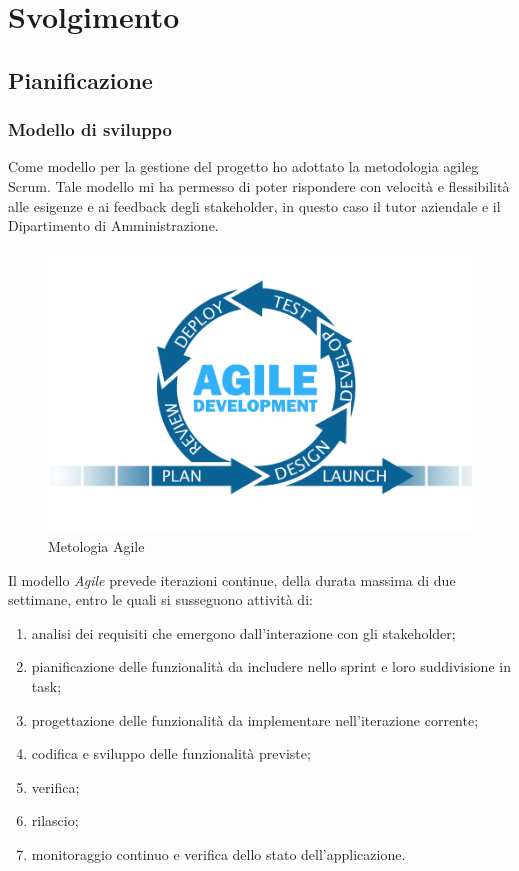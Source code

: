 
\chapter{Svolgimento}
\label{cap:svolgimento}


\section{Pianificazione}
	\subsection{Modello di sviluppo}
	Come modello per la gestione del progetto ho adottato la metodologia \gls{agileg} Scrum. 	
 Tale modello mi ha permesso di poter rispondere con velocità e flessibilità alle esigenze e ai feedback  degli stakeholder, in questo caso il tutor aziendale e il Dipartimento di Amministrazione. \\
	
	\begin{figure}[H]
		\centering
		\includegraphics[width=0.8\linewidth]{immagini/agile}
		\caption{Metologia Agile}
		\label{fig:agile}
	\end{figure}
	
	Il modello \emph{Agile} prevede iterazioni continue, della durata massima di due settimane,
	entro le quali si susseguono attività di:
	\begin{enumerate}
		\item analisi dei requisiti che emergono dall’interazione con gli stakeholder;
		\item pianificazione delle funzionalità da includere nello sprint e loro suddivisione in task;
		\item progettazione delle funzionalità da implementare nell’iterazione corrente;
		\item codifica e sviluppo delle funzionalità previste;
		\item verifica;
		\item rilascio;
		\item monitoraggio continuo e verifica dello stato dell’applicazione.
	\end{enumerate}
	
